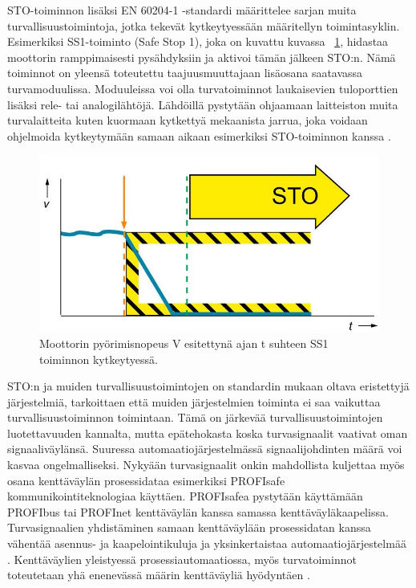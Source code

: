 \documentclass[finnish,12pt,a4paper,pdftex,elec,utf8]{aaltothesis}
\begin{document}
\noindent
STO-toiminnon lisäksi EN 60204-1 -standardi määrittelee sarjan muita turvallisuustoimintoja, jotka tekevät kytkeytyessään määritellyn toimintasyklin. Esimerkiksi SS1-toiminto (Safe Stop 1), joka on kuvattu kuvassa ~\ref{fig:SS1}, hidastaa moottorin ramppimaisesti pysähdyksiin ja aktivoi tämän jälkeen STO:n. Nämä toiminnot on yleensä toteutettu taajuusmuuttajaan lisäosana saatavassa turvamoduulissa. Moduuleissa voi olla turvatoiminnot laukaisevien tuloporttien lisäksi rele- tai analogilähtöjä. Lähdöillä pystytään ohjaamaan laitteiston muita turvalaitteita kuten kuormaan kytkettyä mekaanista jarrua, joka voidaan ohjelmoida kytkeytymään samaan aikaan esimerkiksi STO-toiminnon kanssa \cite{FSO}.

\begin{figure}[H]
	\begin{center}
	\includegraphics[scale=0.5]{SS1}
	\end{center}
	\caption{Moottorin pyörimisnopeus V esitettynä ajan t suhteen SS1 toiminnon kytkeytyessä.
		 \cite{SS1kuva}}
	\label{fig:SS1}
\end{figure}

\noindent
STO:n ja muiden turvallisuustoimintojen on standardin mukaan oltava eristettyjä järjestelmiä, tarkoittaen että muiden järjestelmien toiminta ei saa vaikuttaa turvallisuustoiminnon toimintaan. Tämä on järkevää turvallisuustoimintojen luotettavuuden kannalta, mutta epätehokasta koska turvasignaalit vaativat oman signaaliväylänsä. Suuressa automaatiojärjestelmässä signaalijohdinten määrä voi kasvaa ongelmalliseksi. Nykyään turvasignaalit onkin mahdollista kuljettaa myös osana kenttäväylän prosessidataa esimerkiksi PROFIsafe kommunikointiteknologiaa käyttäen. PROFIsafea pystytään käyttämään PROFIbus tai PROFInet kenttäväylän kanssa samassa kenttäväyläkaapelissa. Turvasignaalien yhdistäminen samaan kenttäväylään prosessidatan kanssa vähentää asennus- ja kaapelointikuluja ja yksinkertaistaa automaatiojärjestelmää \cite{MyyntiHaastattelu}. Kenttäväylien yleistyessä prosessiautomaatiossa, myös turvatoiminnot toteutetaan yhä enenevässä määrin kenttäväyliä hyödyntäen \cite{Profisafe}.
\\\\
\end{document}
